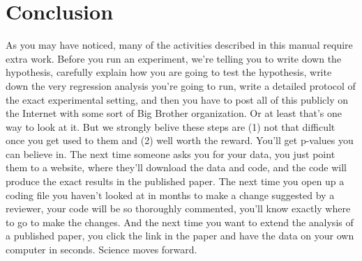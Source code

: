 \documentclass[12pt] {article}
\begin{document}
\section{Conclusion}\label{conclusion}

As you may have noticed, many of the activities described in this manual
require extra work. Before you run an experiment, we're telling you to
write down the hypothesis, carefully explain how you are going to test
the hypothesis, write down the very regression analysis you're going to
run, write a detailed protocol of the exact experimental setting, and
then you have to post all of this publicly on the Internet with some
sort of Big Brother organization. Or at least that's one way to look at
it. But we strongly belive these steps are (1) not that difficult once
you get used to them and (2) well worth the reward. You'll get p-values
you can believe in. The next time someone asks you for your data, you
just point them to a website, where they'll download the data and
code, and the code will produce the exact results in the published
paper. The next time you open up a coding file you haven't looked at in
months to make a change suggested by a reviewer, your code will be so
thoroughly commented, you'll know exactly where to go to make the
changes. And the next time you want to extend the analysis of a
published paper, you click the link in the paper and have the data on
your own computer in seconds. Science moves forward.


\end{document}
